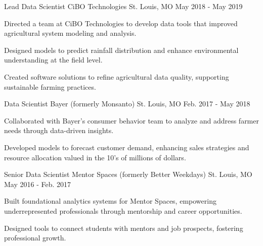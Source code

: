 \begin{cventries}
  \cventry
    {Lead Data Scientist} %
    {CiBO Technologies} %
    {St. Louis, MO} %
    {May 2018 - May 2019} %
    {
      \begin{cvitems} %
        \item {Directed a team at CiBO Technologies to develop data tools that improved agricultural system modeling and analysis.}
        \item {Designed models to predict rainfall distribution and enhance environmental understanding at the field level.}
        \item {Created software solutions to refine agricultural data quality, supporting sustainable farming practices.}
      \end{cvitems}
    }

  \cventry
    {Data Scientist} %
    {Bayer (formerly Monsanto)} %
    {St. Louis, MO} %
    {Feb. 2017 - May 2018} %
    {
      \begin{cvitems} %
        \item {Collaborated with Bayer’s consumer behavior team to analyze and address farmer needs through data-driven insights.}
        \item {Developed models to forecast customer demand, enhancing sales strategies and resource allocation valued in the 10's of millions of dollars.}
      \end{cvitems}
    }

  \cventry
    {Senior Data Scientist} %
    {Mentor Spaces (formerly Better Weekdays)} %
    {St. Louis, MO} %
    {May 2016 - Feb. 2017} %
    {
      \begin{cvitems} %
        \item {Built foundational analytics systems for Mentor Spaces, empowering underrepresented professionals through mentorship and career opportunities.}
        \item {Designed tools to connect students with mentors and job prospects, fostering professional growth.}
      \end{cvitems}
    }


\end{cventries}
